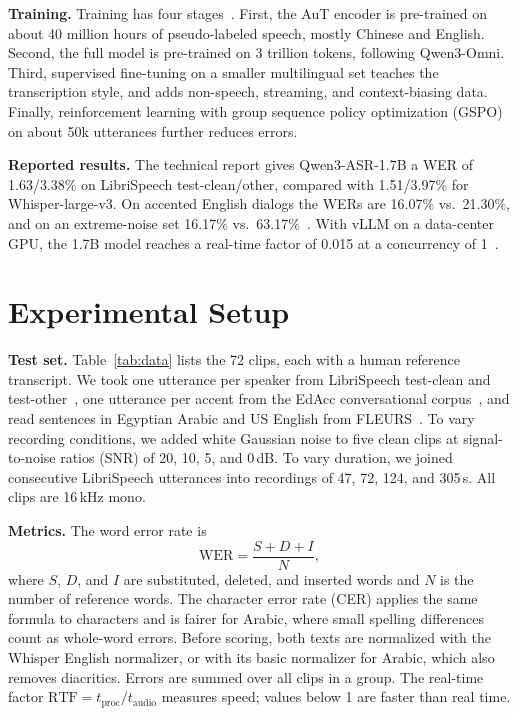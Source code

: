 \documentclass[conference]{IEEEtran}
\begin{document}
\textbf{Training.} Training has four stages~\cite{qwen3asr}. First, the AuT encoder is pre-trained on about 40 million hours of pseudo-labeled speech, mostly Chinese and English. Second, the full model is pre-trained on 3 trillion tokens, following Qwen3-Omni. Third, supervised fine-tuning on a smaller multilingual set teaches the transcription style, and adds non-speech, streaming, and context-biasing data. Finally, reinforcement learning with group sequence policy optimization (GSPO) on about 50k utterances further reduces errors.

\textbf{Reported results.} The technical report gives Qwen3-ASR-1.7B a WER of 1.63/3.38\% on LibriSpeech test-clean/other, compared with 1.51/3.97\% for Whisper-large-v3. On accented English dialogs the WERs are 16.07\% vs.\ 21.30\%, and on an extreme-noise set 16.17\% vs.\ 63.17\%~\cite{qwen3asr}. With vLLM on a data-center GPU, the 1.7B model reaches a real-time factor of 0.015 at a concurrency of 1~\cite{qwen3asr}.

\section{Experimental Setup}
\textbf{Test set.} Table~\ref{tab:data} lists the 72 clips, each with a human reference transcript. We took one utterance per speaker from LibriSpeech test-clean and test-other~\cite{librispeech}, one utterance per accent from the EdAcc conversational corpus~\cite{edacc}, and read sentences in Egyptian Arabic and US English from FLEURS~\cite{fleurs}. To vary recording conditions, we added white Gaussian noise to five clean clips at signal-to-noise ratios (SNR) of 20, 10, 5, and 0\,dB. To vary duration, we joined consecutive LibriSpeech utterances into recordings of 47, 72, 124, and 305\,s. All clips are 16\,kHz mono.

\textbf{Metrics.} The word error rate is
\begin{equation}
\mathrm{WER}=\frac{S+D+I}{N},
\end{equation}
where $S$, $D$, and $I$ are substituted, deleted, and inserted words and $N$ is the number of reference words. The character error rate (CER) applies the same formula to characters and is fairer for Arabic, where small spelling differences count as whole-word errors. Before scoring, both texts are normalized with the Whisper English normalizer, or with its basic normalizer for Arabic, which also removes diacritics. Errors are summed over all clips in a group. The real-time factor $\mathrm{RTF}=t_{\mathrm{proc}}/t_{\mathrm{audio}}$ measures speed; values below 1 are faster than real time.
\end{document}
